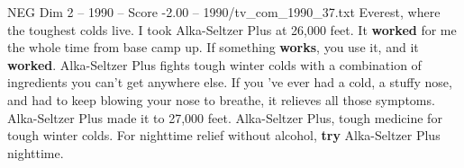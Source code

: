 \begin{textsample}{NEG Dim 2 – 1990 – Score -2.00 – 1990/tv\_com\_1990\_37.txt}  \label{ex:f2_neg_062}
Everest, where the toughest colds live.
I took Alka-Seltzer Plus at 26,000 feet.
It \textbf{worked} for me the whole time from base camp up.
If something \textbf{works}, you use it, and it \textbf{worked}.
Alka-Seltzer Plus fights tough winter colds with a combination of ingredients you can't get anywhere else.
If you 've ever had a cold, a stuffy nose, and had to keep blowing your nose to breathe, it relieves all those symptoms.
Alka-Seltzer Plus made it to 27,000 feet.
Alka-Seltzer Plus, tough medicine for tough winter colds.
For nighttime relief without alcohol, \textbf{try} Alka-Seltzer Plus nighttime.

\end{textsample}
